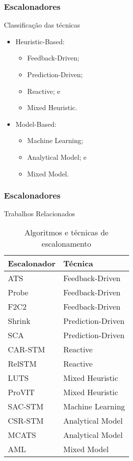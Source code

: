 \documentclass[10pt, pdf,xcolor=pdftex,dvipsnames,table]{beamer}
\begin{document}
\begin{frame} \frametitle{Escalonadores}
\begin{block}{Classificação das técnicas}
\begin{itemize}
	\item Heuristic-Based:
	\begin{itemize}
	    \item Feedback-Driven;
	    \item Prediction-Driven;
	    \item Reactive; e
	    \item Mixed Heuristic.
	\end{itemize}
	\item Model-Based:
	\begin{itemize}
	    \item Machine Learning;
	    \item Analytical Model; e
	    \item Mixed Model.
	\end{itemize}
\end{itemize}
\end{block}
\end{frame}


\begin{frame} \frametitle{Escalonadores}
\begin{block}{Trabalhos Relacionados}
\begin{table}[]
\footnotesize
\centering
\caption{Algoritmos e técnicas de escalonamento}
\label{tab:compare}
\begin{tabular}{l|l}
\hline
Escalonador & Técnica \\ \hline
ATS & Feedback-Driven \\
Probe & Feedback-Driven \\
F2C2 & Feedback-Driven \\
Shrink & Prediction-Driven \\
SCA & Prediction-Driven \\
CAR-STM & Reactive \\
RelSTM & Reactive \\
LUTS & Mixed Heuristic \\
ProVIT & Mixed Heuristic\\
SAC-STM & Machine Learning \\
CSR-STM & Analytical Model \\
MCATS & Analytical Model \\
AML & Mixed Model \\
\hline
\end{tabular}
\end{table}
\end{block}
\end{frame}
\end{document}
